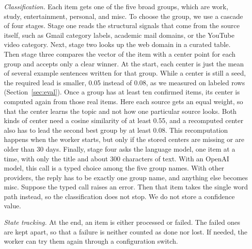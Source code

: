 \documentclass[conference]{IEEEtran}
\begin{document}
\textit{Classification.} Each item gets one of the five broad groups, which are work, study, entertainment, personal, and misc. To choose the group, we use a cascade of four stages. Stage one reads the structural signals that come from the source itself, such as Gmail category labels, academic mail domains, or the YouTube video category. Next, stage two looks up the web domain in a curated table. Then stage three compares the vector of the item with a center point for each group and accepts only a clear winner. At the start, each center is just the mean of several example sentences written for that group. While a center is still a seed, the required lead is smaller, 0.05 instead of 0.08, as we measured on labeled rows (Section~\ref{sec:eval}). Once a group has at least ten confirmed items, its center is computed again from those real items. Here each source gets an equal weight, so that the center learns the topic and not how one particular source looks. Both kinds of center need a cosine similarity of at least 0.55, and a recomputed center also has to lead the second best group by at least 0.08. This recomputation happens when the worker starts, but only if the stored centers are missing or are older than 30 days. Finally, stage four asks the language model, one item at a time, with only the title and about 300 characters of text. With an OpenAI model, this call is a typed choice among the five group names. With other providers, the reply has to be exactly one group name, and anything else becomes misc. Suppose the typed call raises an error. Then that item takes the single word path instead, so the classification does not stop. We do not store a confidence value.

\textit{State tracking.} At the end, an item is either processed or failed. The failed ones are kept apart, so that a failure is neither counted as done nor lost. If needed, the worker can try them again through a configuration switch.
\end{document}
